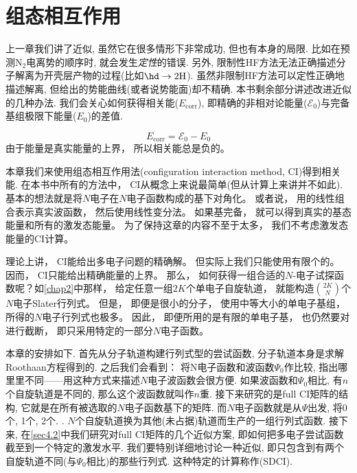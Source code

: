 \chapter{组态相互作用}
上一章我们讲了\hft 近似, 
虽然它在很多情形下非常成功, 
但也有本身的局限. 
\hft 比如在预测$\text{N}_2$电离势的顺序时, 
就会发生\emph{定性}的错误. 
另外, 
限制性HF方法无法正确描述分子解离为开壳层产物的过程(比如$\hd\to2\text{H}$). 
虽然非限制HF方法可以定性正确地描述解离, 
但给出的势能曲线(或者说势能面)却不精确. 
本书剩余部分讲述改进\hft 近似的几种办法. 
我们会关心如何获得相关能($E_\mathrm{corr}$), 
即精确的非相对论能量($\mathscr{E}_0$)与完备基组极限下\hft 能量($E_0$)的差值.

\begin{equation}
E_\mathrm{corr}=\mathscr{E}_0-E_0
\end{equation}
由于\hft 能量是真实能量的上界，
所以相关能总是负的。


本章我们来使用组态相互作用法(configuration interaction method, 
CI)得到相关能. 
在本书中所有的方法中，
CI从概念上来说最简单(但从计算上来讲并不如此). 
基本的想法就是将$N$电子\ha 在$N$电子函数构成的基下对角化。
或者说，
用的线性组合表示真实波函数，
然后使用线性变分法。
如果基完备，
就可以得到真实的基态能量和所有的激发态能量。
为了保持这章的内容不至于太多，
我们不考虑激发态能量的CI计算。



理论上讲，
CI能给出多电子问题的精确解。
但实际上我们只能使用有限个的。
因而，
CI只能给出精确能量的上界。
那么，
如何获得一组合适的$N$-电子试探函数呢？如\autoref{chap2}中那样，
给定任意一组$2K$个单电子自旋轨道，
就能构造$\binom{2K}{N}$个$N$电子Slater行列式。
但是，
即便是很小的分子，
使用中等大小的单电子基组，
所得的$N$电子行列式也极多。
因此，
即便所用的是有限的单电子基，
也仍然要对进行截断，
即只采用特定的一部分$N$电子函数。



本章的安排如下. 
首先从\hft 分子轨道构建行列式型的尝试函数, 
分子轨道本身是求解Roothaan方程得到的. 
之后我们会看到： 将N电子函数和\hft 波函数$\Psi_0$作比较, 
指出哪里里不同——用这种方式来描述$N$电子波函数会很方便. 
如果波函数和$\Psi_0$相比, 
有$n$个自旋轨道是不同的, 
那么这个波函数就叫作$n$重. 
接下来研究的是full CI矩阵的结构, 
它就是\ha 在所有被选取的$N$电子函数基下的矩阵. 
而$N$电子函数就是从$\Psi$出发, 
将0个, 
1个, 
2个.
. 
$N$个自旋轨道换为其他(未占据)轨道而生产的一组行列式函数. 
接下来, 
在\autoref{sec4.2}中我们研究对full CI矩阵的几个近似方案, 
即如何把多电子尝试函数截至到一个特定的激发水平. 
我们要特别详细地讨论一种近似, 
即只包含到有两个自旋轨道不同(与$\Psi_0$相比)的那些行列式. 
这种特定的计算称作(SDCI).


